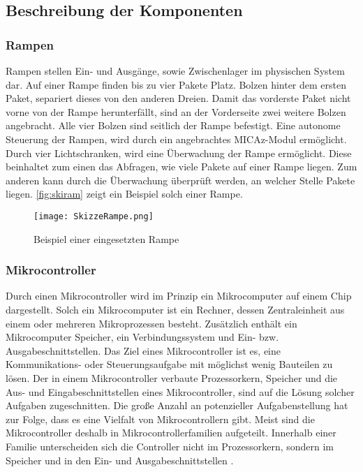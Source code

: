 \subsection{Beschreibung der Komponenten}
\subsubsection{Rampen}
Rampen stellen Ein- und Ausgänge, sowie Zwischenlager im physischen System dar. Auf einer Rampe finden bis zu vier Pakete Platz. Bolzen hinter dem ersten Paket, separiert dieses von den anderen Dreien. Damit das vorderste Paket nicht vorne von der Rampe herunterfällt, sind an der Vorderseite zwei weitere Bolzen angebracht. Alle vier Bolzen sind seitlich der Rampe befestigt. Eine autonome Steuerung der Rampen, wird durch ein angebrachtes MICAz-Modul ermöglicht. Durch vier Lichtschranken, wird eine Überwachung der Rampe ermöglicht. Diese beinhaltet zum einen das Abfragen, wie viele Pakete auf einer Rampe liegen. Zum anderen kann durch die Überwachung überprüft werden, an welcher Stelle Pakete liegen. \autoref{fig:skiram} zeigt ein Beispiel solch einer Rampe.

\begin{figure}[h!]
	\centering
		\texttt{[image: SkizzeRampe.png]}
	\caption{Beispiel einer eingesetzten Rampe}
	\label{fig:skiram}
\end{figure}

\subsubsection{Mikrocontroller}
Durch einen Mikrocontroller wird im Prinzip ein Mikrocomputer auf einem Chip dargestellt. Solch ein Mikrocomputer ist ein Rechner, dessen Zentraleinheit aus einem oder mehreren Mikroprozessen besteht. Zusätzlich enthält ein Mikrocomputer Speicher, ein Verbindungssystem und Ein- bzw. Ausgabeschnittstellen. Das Ziel eines Mikrocontroller ist es, eine Kommunikations- oder Steuerungsaufgabe mit möglichst wenig Bauteilen zu lösen. Der in einem Mikrocontroller verbaute Prozessorkern, Speicher und die Aus- und Eingabeschnittstellen eines Mikrocontroller, sind auf die Lösung solcher Aufgaben zugeschnitten. Die große Anzahl an potenzieller Aufgabenstellung hat zur Folge, dass es eine Vielfalt von Mikrocontrollern gibt. Meist sind die Mikrocontroller deshalb in Mikrocontrollerfamilien aufgeteilt. Innerhalb einer Familie unterscheiden sich die Controller nicht im Prozessorkern, sondern im Speicher und in den Ein- und Ausgabeschnittstellen \cite{ECHT2005}.

